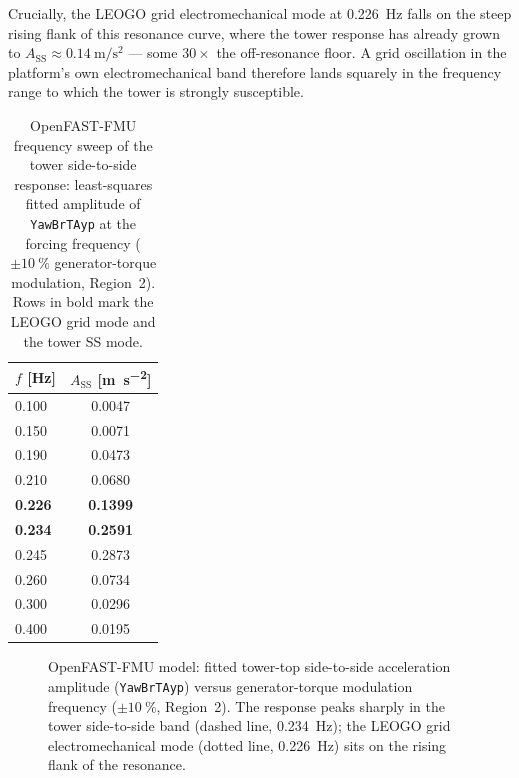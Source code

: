 Crucially, the LEOGO grid electromechanical mode at \SI{0.226}{\hertz} falls on
the steep rising flank of this resonance curve, where the tower response has
already grown to \(A_{\mathrm{SS}} \approx \SI{0.14}{\metre\per\second\squared}\)
--- some \(30\times\) the off-resonance floor. A grid oscillation in the
platform's own electromechanical band therefore lands squarely in the frequency
range to which the tower is strongly susceptible.

\begin{table}[t]
  \centering
  \caption{OpenFAST-FMU frequency sweep of the tower side-to-side response:
  least-squares fitted amplitude of \texttt{YawBrTAyp} at the forcing frequency
  (\(\pm\SI{10}{\percent}\) generator-torque modulation, Region~2). Rows in bold
  mark the LEOGO grid mode and the tower SS mode.}
  \label{tab:ss-sweep}
  \begin{tabular}{lc}
    \toprule
    \(f\) [\si{\hertz}] &
      \(A_{\mathrm{SS}}\) [\si{\metre\per\second\squared}] \\
    \midrule
    0.100          & 0.0047 \\
    0.150          & 0.0071 \\
    0.190          & 0.0473 \\
    0.210          & 0.0680 \\
    \textbf{0.226} & \textbf{0.1399} \\
    \textbf{0.234} & \textbf{0.2591} \\
    0.245          & 0.2873 \\
    0.260          & 0.0734 \\
    0.300          & 0.0296 \\
    0.400          & 0.0195 \\
    \bottomrule
  \end{tabular}
\end{table}

\begin{figure}[t]
  \centering
  \caption{OpenFAST-FMU model: fitted tower-top side-to-side acceleration
  amplitude (\texttt{YawBrTAyp}) versus generator-torque modulation frequency
  (\(\pm\SI{10}{\percent}\), Region~2). The response peaks sharply in the tower
  side-to-side band (dashed line, \SI{0.234}{\hertz}); the LEOGO grid
  electromechanical mode (dotted line, \SI{0.226}{\hertz}) sits on the rising
  flank of the resonance.}
  \label{fig:ss-curve}
\end{figure}

